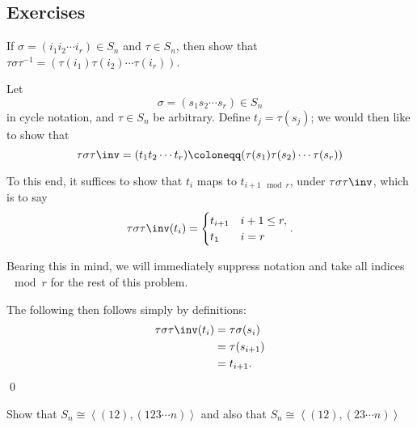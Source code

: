 \subsection{Exercises}

\begin{problem}[Hungerford 1.6.3]
If $\sigma = (i_1 i_2 \cdots i_r) \in S_n$ and $\tau \in S_n$, then show that $\tau\sigma\tau^{-1} = (\tau(i_1) \tau(i_2) \cdots \tau(i_r))$.
\end{problem}

\begin{solution}
  Let
  $$\sigma = (s_1 s_2 \cdots s_r) \in S_n$$
  in cycle notation, and $\tau \in S_n$ be arbitrary. Define $t_j = \tau(s_j)$; we would then like to show that $$\tau\sigma\tau\inv = (t_1 t_2 \cdots t_r) \coloneqq (\tau(s_1) \tau(s_2) \cdots \tau(s_r))$$

  To this end, it suffices to show that $t_i$ maps to $t_{i+1 \mod r}$, under $\tau\sigma\tau\inv$, which is to say
  $$
  \tau\sigma\tau\inv(t_i) =
  \begin{cases}
    t_{i+1} & i+1 \leq r, \\
    t_1 & i = r
  \end{cases}.
  $$

  Bearing this in mind, we will immediately suppress notation and take all indices $\mod r$ for the rest of this problem.

  The following then follows simply by definitions:
  \begin{align*}
  \tau\sigma\tau\inv(t_i) &= \tau\sigma(s_i) \\
                          &= \tau(s_{i+1}) \\
                          &= t_{i+1}
  .\end{align*}
  \qed
\end{solution}

\begin{problem}[Hungerford 1.6.4]
\label{prob:1.2}
Show that $S_n \cong \left\langle (12), (123\cdots n)\right\rangle$ and also that $S_n \cong \left\langle (12), (23\cdots n)\right\rangle$
\end{problem}

